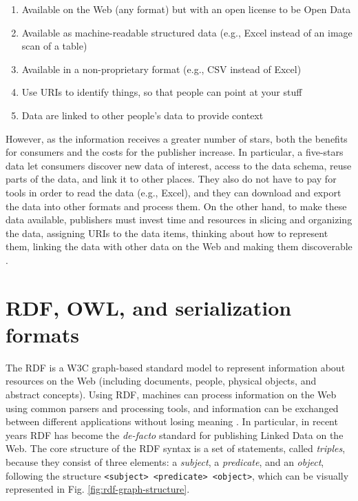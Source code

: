 \begin{enumerate}[%
align=right,
leftmargin=*,
labelindent=\widthof{\Stars{5}}
]
    \item[\Stars{1}] Available on the Web (any format) but with an open license to be Open Data
    \item[\Stars{2}] Available as machine-readable structured data (e.g., Excel instead of an image scan of a table)
    \item[\Stars{3}] Available in a non-proprietary format (e.g., \acs{CSV} instead of Excel)
    \item[\Stars{4}] Use \acp{URI} to identify things, so that people can point at your stuff
    \item[\Stars{5}] Data are linked to other people's data to provide context
\end{enumerate}

However, as the information receives a greater number of stars, both the benefits for consumers and the costs for the publisher increase. In particular, a five-stars data let consumers discover new data of interest, access to the data schema, reuse parts of the data, and link it to other places. They also do not have to pay for tools in order to read the data (e.g., Excel), and they can download and export the data into other formats and process them. On the other hand, to make these data available, publishers must invest time and resources in slicing and organizing the data, assigning \acp{URI} to the data items, thinking about how to represent them, linking the data with other data on the Web and making them discoverable \cite{bauer2011linked}.

\section{RDF, OWL, and serialization formats}
\label{sec:rdf-owl-formats}

The \acf{RDF} is a \ac{W3C} graph-based standard model to represent information about resources on the Web (including documents, people, physical objects, and abstract concepts). Using \ac{RDF}, machines can process information on the Web using common parsers and processing tools, and information can be exchanged between different applications without losing meaning \cite{world2014rdfprimer}. In particular, in recent years \ac{RDF} has become the \textit{de-facto} standard for publishing Linked Data on the Web. The core structure of the \ac{RDF} syntax is a set of statements, called \textit{triples}, because they consist of three elements: a \textit{subject}, a \textit{predicate}, and an \textit{object}, following the structure \verb#<subject> <predicate> <object>#, which can be visually represented in Fig. \ref{fig:rdf-graph-structure}.

